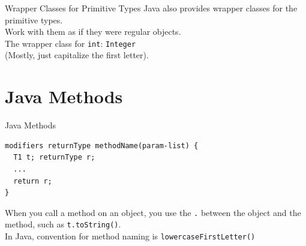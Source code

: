 \documentclass[aspectratio=169]{beamer}
\begin{document}
\begin{frame}{Wrapper Classes for Primitive Types}
Java also provides wrapper classes for the primitive types. \\
\vspace{0.5em}
Work with them as if they were regular objects. \\
\vspace{0.5em}
The wrapper class for \texttt{int}: \texttt{Integer} \\ 
\vspace{0.5em}
(Mostly, just capitalize the first letter). \\
\end{frame}



\section{Java Methods}



\begin{frame}[fragile]{Java Methods}
\begin{verbatim}
modifiers returnType methodName(param-list) {
  T1 t; returnType r;
  ...
  return r;
}
\end{verbatim}

When you call a method on an object, you use the \texttt{.} between the object and the method, such as \texttt{t.toString()}. \\
\vspace{0.5em}
In Java, convention for method naming is {\tt lowercaseFirstLetter()}

\end{frame}
\end{document}
